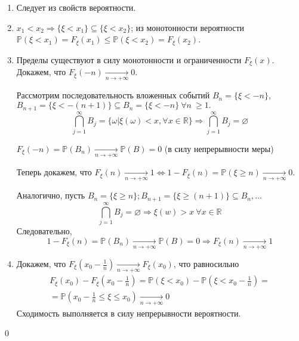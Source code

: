 \documentclass[oneside,final,14pt]{extreport}
\newcommand\myprob[1]{{\mathbb{P}(#1)}}
\renewenvironment{proof}{{\bfseries Доказательство.}}{\qed}
\theoremstyle{plain}
\theoremstyle{definition}
\theoremstyle{named}
\begin{document}
\begin{proof}
\begin{enumerate}
    \item Следует из свойств вероятности.
    \item 
        $x_1 < x_2 \Rightarrow \{ \xi < x_1 \} \subseteq \{ \xi < x_2\}$; из монотонности вероятности $\myprob{\xi < x_1} = F_\xi(x_1) \leqslant \myprob{\xi < x_2} = F_\xi(x_2)$.
    \item 
        Пределы существуют в силу монотонности и ограниченности $F_\xi(x)$. Докажем, что $F_\xi(-n) \xrightarrow[n \rightarrow +\infty]{} 0$.
        
        Рассмотрим последовательность вложенных событий $B_n = \{ \xi < -n \}$, 
        $B_{n+1} = \{\xi < -(n+1) \} \subseteq B_n = \{ \xi < -n \} ~ \forall n ~ \geq 1.$
        \begin{equation*}
            \bigcap\limits_{j = 1}^{\infty}B_j = \{ \omega | \xi(\omega) < x, \forall x \in \mathbb{R} \} \Rightarrow \bigcap\limits_{j = 1}^{\infty}B_j = \varnothing
        \end{equation*}
    
        $F_\xi(-n) = \myprob{B_n} \xrightarrow[n \rightarrow +\infty]{} \myprob{B} = 0$ (в силу непрерывности меры)
    
        Теперь докажем, что $F_\xi(n) \xrightarrow[n \rightarrow +\infty]{} 1 \Leftrightarrow 1 - F_\xi(n) = \myprob{\xi \geq n} \xrightarrow[n \rightarrow +\infty]{} 0$.
    
        Аналогично, пусть $B_n = \{\xi \geq n\}; B_{n+1} = \{ \xi \geq (n+1) \} \subseteq B_n, ...$
        \begin{equation*}
            \bigcap\limits_{j = 1}^{\infty}B_j = \varnothing \Rightarrow \xi(w) > x~\forall x \in \mathbb{R}
        \end{equation*}
        Следовательно, 
        \begin{equation*}
            1 - F_\xi(n) = \myprob{B_n} \xrightarrow[n \rightarrow +\infty]{} \myprob{B} = 0 \Rightarrow F_\xi(n) \xrightarrow[n \rightarrow +\infty]{}1
        \end{equation*}
    \item
        Докажем, что $F_\xi(x_0 - \frac{1}{n}) \xrightarrow[n \rightarrow +\infty]{} F_\xi(x_0)$, что равносильно 
        \begin{multline*}
            F_\xi(x_0) - F_\xi \left(x_0 - \frac{1}{n} \right) 
            = \myprob{\xi < x_0} - \myprob{\xi < x_0 - \frac{1}{n}} = \\ 
            = \myprob{x_0 - \frac{1}{n} \leqslant \xi \leqslant x_0} \xrightarrow[n \to +\infty]{} 0
                \end{multline*}
        Сходимость выполняется в силу непрерывности вероятности.
\end{enumerate}
\end{proof}
\end{document}
